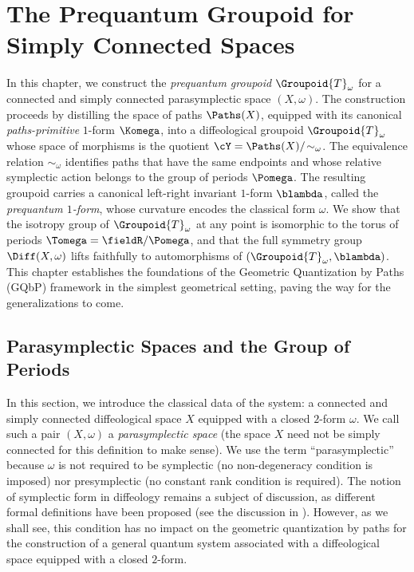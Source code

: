 \chapter{The Prequantum Groupoid for Simply Connected Spaces}
\label{chap:The Prequantum Groupoid for Simply Connected Spaces}

In this chapter,
we construct the \emph{prequantum groupoid} $\Groupoid{T}_\omega$ for a connected and simply connected parasymplectic space $(X,\omega)$.
The construction proceeds by distilling the space of paths $\Paths(X)$,
equipped with its canonical \emph{paths-primitive} $1$-form $\Komega$,
into a diffeological groupoid $\Groupoid{T}_\omega$ whose space of morphisms is the quotient $\cY = \Paths(X)/\!\sim_\omega$.
The equivalence relation $\sim_\omega$ identifies paths that have the same endpoints and whose relative symplectic action belongs to the group of periods $\Pomega$.
The resulting groupoid carries a canonical left-right invariant $1$-form $\blambda$,
called the \emph{prequantum $1$-form},
whose curvature encodes the classical form $\omega$.
We show that the isotropy group of $\Groupoid{T}_\omega$ at any point is isomorphic to the torus of periods $\Tomega = \fieldR/\Pomega$,
and that the full symmetry group $\Diff(X,\omega)$ lifts faithfully to automorphisms of $(\Groupoid{T}_\omega,\blambda)$.
This chapter establishes the foundations of the Geometric Quantization by Paths (GQbP) framework
in the simplest geometrical setting,
paving the way for the generalizations to come.

\section{Parasymplectic Spaces and the Group of Periods}
\label{sec:Parasymplectic Spaces and the Group of Periods}

In this section,
we introduce the classical data of the system:
a connected and simply connected diffeological space $X$ equipped with a closed $2$-form $\omega$.
We call such a pair $(X,\omega)$ a \emph{parasymplectic space}
(the space $X$ need not be simply connected for this definition to make sense).
We use the term ``parasymplectic'' because $\omega$ is not required to be symplectic
(no non-degeneracy condition is imposed)
nor presymplectic (no constant rank condition is required).
The notion of symplectic form in diffeology remains a subject of discussion,
as different formal definitions have been proposed
(see the discussion in \cite{PIZ10}).
However,
as we shall see,
this condition has no impact on the geometric quantization by paths
for the construction of a general quantum system associated with a diffeological space equipped with a closed $2$-form.

